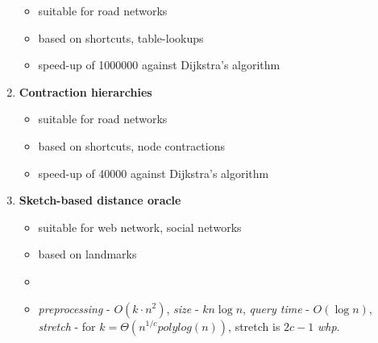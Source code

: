 \documentclass[a4paper]{article}
\begin{document}
\begin{enumerate}
            \begin{itemize}
                \item suitable for road networks
                \item based on shortcuts, table-lookups
                \item speed-up of 1000000 against Dijkstra's algorithm
            \end{itemize}
            \item \textbf{Contraction hierarchies}
            \begin{itemize}
                \item suitable for road networks
                \item based on shortcuts, node contractions
                \item speed-up of 40000 against Dijkstra's algorithm
            \end{itemize}
            \item \textbf{Sketch-based distance oracle}
            \begin{itemize}
                \item suitable for web network, social networks
                \item based on landmarks
                \item \item \emph{preprocessing} - $O(k \cdot n^2)$, \emph{size} - $k n \log n$, \emph{query time} - $O(\log n)$, \emph{stretch} - for $k=\Theta (n^{1/c}polylog(n))$, stretch is $2c - 1$ \emph{whp}.
            \end{itemize}
        \end{enumerate}

    \pagebreak
    
    {}
\end{document}
